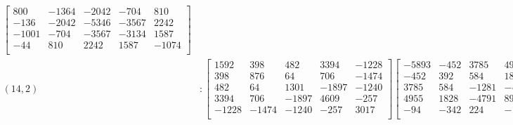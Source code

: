\documentclass[12pt]{amsart}
\theoremstyle{plain}
\theoremstyle{definition}
\begin{document}
\begin{landscape}
\begin{align*}
\begin{bmatrix}
 800  &   -1364  &   -2042  &   -704  &   810  \\ 
 -136  &   -2042  &   -5346  &   -3567  &   2242  \\ 
 -1001  &   -704  &   -3567  &   -3134  &   1587  \\ 
 -44  &   810  &   2242  &   1587  &   -1074  \\ 
\end{bmatrix}
\\
(14,2) &:
\begin{bmatrix}
1592  &   398  &   482  &   3394  &   -1228  \\ 
 398  &   876  &   64  &   706  &   -1474  \\ 
 482  &   64  &   1301  &   -1897  &   -1240  \\ 
 3394  &   706  &   -1897  &   4609  &   -257  \\ 
 -1228  &   -1474  &   -1240  &   -257  &   3017  \\ 
\end{bmatrix}
\begin{bmatrix}
-5893  &   -452  &   3785  &   4955  &   -94  \\ 
 -452  &   392  &   584  &   1828  &   -342  \\ 
 3785  &   584  &   -1281  &   -4791  &   224  \\ 
 4955  &   1828  &   -4791  &   895  &   -1729  \\ 
 -94  &   -342  &   224  &   -1729  &   369  \\ 
\end{bmatrix}
\begin{bmatrix}
-962  &   362  &   -1287  &   2701  &   2407  \\ 
 362  &   -549  &   -347  &   1527  &   -649  \\ 
 -1287  &   -347  &   -729  &   -497  &   3687  \\ 
 2701  &   1527  &   -497  &   1651  &   -4922  \\ 
 2407  &   -649  &   3687  &   -4922  &   -7684  \\ 
\end{bmatrix}
\begin{bmatrix}
-236  &   -544  &   172  &   -1466  &   604  \\ 
 -544  &   -356  &   572  &   -1566  &   398  \\ 
 172  &   572  &   4  &   1912  &   -662  \\ 
 -1466  &   -1566  &   1912  &   -2928  &   1603  \\ 
 604  &   398  &   -662  &   1603  &   -437  \\ 
\end{bmatrix}
\\
\end{align*} 
\end{landscape}
\end{document}

